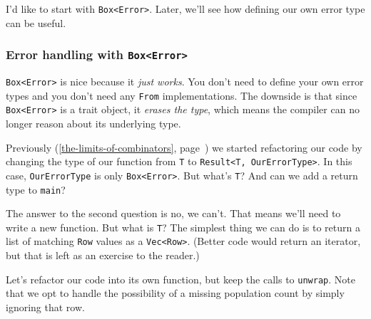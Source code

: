 \documentclass[a4paper,]{book}
\renewcommand*{\hypertarget}[3][\ar]{%
  \def\ar{#2}%
  \label{#1}%
  #3}
\renewcommand*{\hyperlink}[2]{%
 #2 (\autoref{#1}, page~\pageref{#1})}
\begin{document}
I'd like to start with \texttt{Box\textless{}Error\textgreater{}}.
Later, we'll see how defining our own error type can be useful.

\hypertarget{error-handling-with-boxerror}{\subsubsection{\texorpdfstring{Error
handling with
\texttt{Box\textless{}Error\textgreater{}}}{Error handling with Box\textless{}Error\textgreater{}}}\label{error-handling-with-boxerror}}

\texttt{Box\textless{}Error\textgreater{}} is nice because it \emph{just
works}. You don't need to define your own error types and you don't need
any \texttt{From} implementations. The downside is that since
\texttt{Box\textless{}Error\textgreater{}} is a trait object, it
\emph{erases the type}, which means the compiler can no longer reason
about its underlying type.

\protect\hyperlink{the-limits-of-combinators}{Previously} we started
refactoring our code by changing the type of our function from
\texttt{T} to \texttt{Result\textless{}T,\ OurErrorType\textgreater{}}.
In this case, \texttt{OurErrorType} is only
\texttt{Box\textless{}Error\textgreater{}}. But what's \texttt{T}? And
can we add a return type to \texttt{main}?

The answer to the second question is no, we can't. That means we'll need
to write a new function. But what is \texttt{T}? The simplest thing we
can do is to return a list of matching \texttt{Row} values as a
\texttt{Vec\textless{}Row\textgreater{}}. (Better code would return an
iterator, but that is left as an exercise to the reader.)

Let's refactor our code into its own function, but keep the calls to
\texttt{unwrap}. Note that we opt to handle the possibility of a missing
population count by simply ignoring that row.
\end{document}
